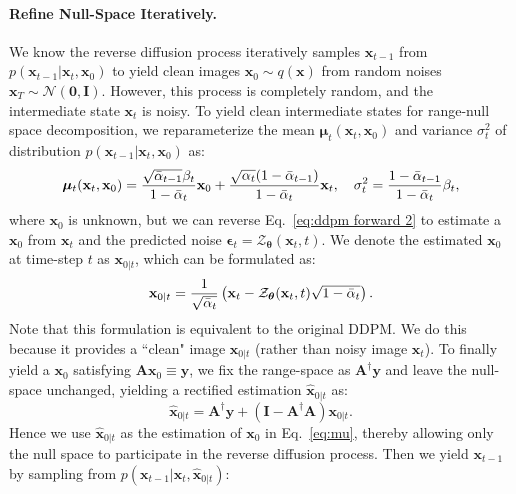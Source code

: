 \documentclass{article} \usepackage{iclr2023_conference,times}
\begin{document}
\paragraph{Refine Null-Space Iteratively.} We know the reverse diffusion process iteratively samples $\mathbf{x}_{t-1}$ from $p(\mathbf{x}_{t-1}|\mathbf{x}_{t},\mathbf{x}_{0})$ to yield clean images $\mathbf{x}_{0} \sim q(\mathbf{x})$ from random noises $\mathbf{x}_{T} \sim \mathcal{N}(\mathbf{0},\mathbf{I})$. However, this process is completely random, and the intermediate state $\mathbf{x}_{t}$ is noisy. To yield clean intermediate states for range-null space decomposition, we reparameterize the mean $\boldsymbol{\mu}_{t}(\mathbf{x}_{t},\mathbf{x}_{0})$ and variance $\sigma_t^{2}$ of distribution $p(\mathbf{x}_{t-1}|\mathbf{x}_{t},\mathbf{x}_{0})$ as: 
\begin{equation}
    \boldsymbol{\mu}_{t}(\mathbf{x}_{t},\mathbf{x}_{0}) = \frac{\sqrt{\Bar{\alpha}_{t-1}}\beta_{t}}{1-\Bar{\alpha}_{t}}\mathbf{x}_{0}+ \frac{\sqrt{\alpha_{t}}(1-\Bar{\alpha}_{t-1})}{1-\Bar{\alpha}_{t}}\mathbf{x}_{t},\quad \mathbf{\sigma}_{t}^{2} = \frac{1-\Bar{\alpha}_{t-1}}{1-\Bar{\alpha}_{t}}\beta_{t},
    \label{eq:mu}
\end{equation}
where $\mathbf{x}_{0}$ is unknown, but we can reverse Eq.~\ref{eq:ddpm forward 2} to estimate a $\mathbf{x}_{0}$ from $\mathbf{x}_{t}$ and the predicted noise $\boldsymbol{\epsilon}_t=\mathcal{Z}_{\boldsymbol{\theta}}(\mathbf{x}_{t},t)$. We denote the estimated $\mathbf{x}_{0}$ at time-step $t$ as $\mathbf{x}_{0|
t}$, which can be formulated as:
\begin{equation}
    \mathbf{x}_{0|t} = \frac{1}{\sqrt{\Bar{\alpha}_{t}}}	\left( \mathbf{x}_{t} - \mathcal{Z}_{\boldsymbol{\theta}}(\mathbf{x}_{t},t)\sqrt{1-\Bar{\alpha}_{t}} \right).
    \label{eq:x0t}
\end{equation}
Note that this formulation is equivalent to the original DDPM. We do this because it provides a ``clean" image $\mathbf{x}_{0|t}$ (rather than noisy image $\mathbf{x}_{t}$). To finally yield a $\mathbf{x}_{0}$ satisfying $\mathbf{A}\mathbf{x}_{0}\equiv \mathbf{y}$, we fix the range-space as $\mathbf{A}^{\dagger}\mathbf{y}$ and leave the null-space unchanged, yielding a rectified estimation $\hat{\mathbf{x}}_{0|t}$ as: 
\begin{equation}
    \hat{\mathbf{x}}_{0|t}=\mathbf{A^{\dagger}}\mathbf{y} + (\mathbf{I} - \mathbf{A^{\dagger}}\mathbf{A})\mathbf{x}_{0|t}.
    \label{eq:ndm core}
\end{equation}
Hence we use $\hat{\mathbf{x}}_{0|t}$ as the estimation of $\mathbf{x}_{0}$ in Eq.~\ref{eq:mu}, thereby allowing only the null space to participate in the reverse diffusion process. Then we yield $\mathbf{x}_{t-1}$ by sampling from $p(\mathbf{x}_{t-1}|\mathbf{x}_{t},\hat{\mathbf{x}}_{0|t})$:
\end{document}
